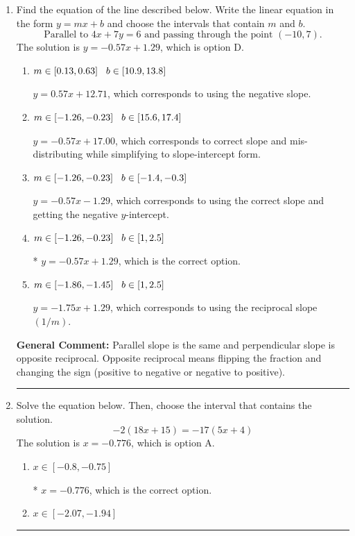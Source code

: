 \documentclass{extbook}[14pt]
\newcommand{\litem}[1]{\item #1

\rule{\textwidth}{0.4pt}}
\begin{document}
\begin{enumerate}\litem{
Find the equation of the line described below. Write the linear equation in the form $ y=mx+b $ and choose the intervals that contain $m$ and $b$.
\[ \text{Parallel to } 4 x + 7 y = 6 \text{ and passing through the point } (-10, 7). \]The solution is \( y = -0.57x + 1.29 \), which is option D.\begin{enumerate}[label=\Alph*.]
\item \( m \in [0.13, 0.63] \hspace*{3mm} b \in [10.9, 13.8] \)

 $y = 0.57x + 12.71$, which corresponds to using the negative slope.
\item \( m \in [-1.26, -0.23] \hspace*{3mm} b \in [15.6, 17.4] \)

 $y = -0.57x + 17.00$, which corresponds to correct slope and mis-distributing while simplifying to slope-intercept form.
\item \( m \in [-1.26, -0.23] \hspace*{3mm} b \in [-1.4, -0.3] \)

 $y = -0.57x - 1.29$, which corresponds to using the correct slope and getting the negative $y$-intercept.
\item \( m \in [-1.26, -0.23] \hspace*{3mm} b \in [1, 2.5] \)

* $y = -0.57x + 1.29$, which is the correct option.
\item \( m \in [-1.86, -1.45] \hspace*{3mm} b \in [1, 2.5] \)

 $y = -1.75x + 1.29$, which corresponds to using the reciprocal slope $(1/m)$.
\end{enumerate}

\textbf{General Comment:} Parallel slope is the same and perpendicular slope is opposite reciprocal. Opposite reciprocal means flipping the fraction and changing the sign (positive to negative or negative to positive).
}
\litem{
Solve the equation below. Then, choose the interval that contains the solution.
\[ -2(18x + 15) = -17(5x + 4) \]The solution is \( x = -0.776 \), which is option A.\begin{enumerate}[label=\Alph*.]
\item \( x \in [-0.8, -0.75] \)

* $x = -0.776$, which is the correct option.
\item \( x \in [-2.07, -1.94] \)


\end{enumerate}}
\end{enumerate}
\end{document}
